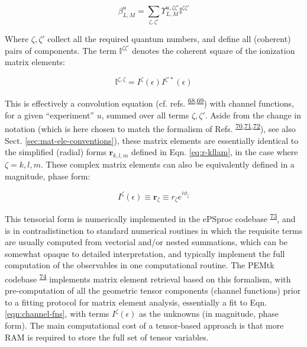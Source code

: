 \documentclass[10pt]{article}
\begin{document}
\begin{equation}
\beta_{L,M}^{u}=\sum_{\zeta,\zeta'}\varUpsilon_{L,M}^{u,\zeta\zeta'}\mathbb{I}^{\zeta\zeta'}\label{eqn:channel-fns}
\end{equation}


Where $\zeta,\zeta'$ collect all the required quantum numbers, and define all (coherent) pairs of components. The term $\mathbb{I}^{\zeta\zeta'}$ denotes the coherent square of the ionization matrix elements:

\begin{equation}
\mathbb{I}^{\zeta,\zeta}=I^{\zeta}(\epsilon)I^{\zeta'*}(\epsilon)
\label{eqn:I-zeta}
\end{equation}

This is effectively a convolution equation (cf. refs. \textsuperscript{\hyperref[csl:68]{68},\hyperref[csl:69]{69}}) with channel functions, for a given ``experiment'' $u$, summed over all terms $\zeta,\zeta'$. Aside from the change in notation (which is here chosen to match the formalism of Refs. \textsuperscript{\hyperref[csl:70]{70},\hyperref[csl:71]{71},\hyperref[csl:72]{72}}), see also Sect. \ref{sec:mat-ele-conventions}), these matrix elements are essentially identical to the simplified (radial) forms $\mathbf{r}_{k,l,m}$ defined in Eqn. \ref{eq:r-kllam}, in the case where $\zeta=k,l,m$. These complex matrix elements can also be equivalently defined in a magnitude, phase form:

\begin{equation}
I^{\zeta}(\epsilon)\equiv\mathbf{r}_{\zeta}\equiv r_{\zeta}e^{i\phi_{\zeta}}
\end{equation}


This tensorial form is numerically implemented in the ePSproc codebase \textsuperscript{\hyperref[csl:73]{73}}, and is in contradistinction to standard numerical routines in which the requisite terms are usually computed from vectorial and/or nested summations, which can be somewhat opaque to detailed interpretation, and typically implement the full computation of the observables in one computational routine. The PEMtk codebase \textsuperscript{\hyperref[csl:74]{74}} implements matrix element retrieval based on this formalism, with pre-computation of all the geometric tensor components (channel functions) prior to a fitting protocol for matrix element analysis, essentially a fit to Eqn. \ref{eqn:channel-fns}, with terms $I^{\zeta}(\epsilon)$ as the unknowns (in magnitude, phase form). The main computational cost of a tensor-based approach is that more RAM is required to store the full set of tensor variables.
\end{document}
